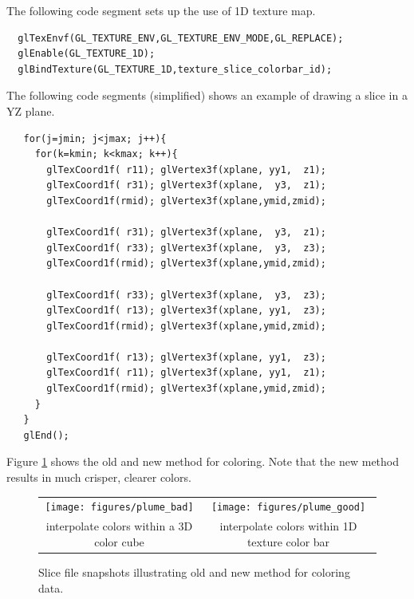 \documentclass[11pt,twoside]{book}
\newcommand{\figoptions}{htp}
\begin{document}
The following code segment sets up the use of 1D texture map.

\begin{verbatim}
  glTexEnvf(GL_TEXTURE_ENV,GL_TEXTURE_ENV_MODE,GL_REPLACE);
  glEnable(GL_TEXTURE_1D);
  glBindTexture(GL_TEXTURE_1D,texture_slice_colorbar_id);
\end{verbatim}

The following code segments (simplified) shows an example of drawing a slice in a YZ plane.

\begin{verbatim}
   for(j=jmin; j<jmax; j++){
     for(k=kmin; k<kmax; k++){
       glTexCoord1f( r11); glVertex3f(xplane, yy1,  z1);
       glTexCoord1f( r31); glVertex3f(xplane,  y3,  z1);
       glTexCoord1f(rmid); glVertex3f(xplane,ymid,zmid);

       glTexCoord1f( r31); glVertex3f(xplane,  y3,  z1);
       glTexCoord1f( r33); glVertex3f(xplane,  y3,  z3);
       glTexCoord1f(rmid); glVertex3f(xplane,ymid,zmid);

       glTexCoord1f( r33); glVertex3f(xplane,  y3,  z3);
       glTexCoord1f( r13); glVertex3f(xplane, yy1,  z3);
       glTexCoord1f(rmid); glVertex3f(xplane,ymid,zmid);

       glTexCoord1f( r13); glVertex3f(xplane, yy1,  z3);
       glTexCoord1f( r11); glVertex3f(xplane, yy1,  z1);
       glTexCoord1f(rmid); glVertex3f(xplane,ymid,zmid);
     }
   }
   glEnd();
\end{verbatim}



Figure \ref{fignewslice} shows the old and new method for coloring.  Note that the new method results in much crisper, clearer colors.
\begin{figure}[\figoptions]
\begin{center}
\begin{tabular}{cc}
\texttt{[image: figures/plume\_bad]}&\texttt{[image: figures/plume\_good]}\\
interpolate colors within a 3D color cube&interpolate colors within 1D texture color bar\\
\end{tabular}
\caption [Slice file snapshots illustrating old and new method for
coloring data.] {Slice file snapshots illustrating old and new
method for coloring data.}
\label{fignewslice}%
\end{center}
\end{figure}
\end{document}
